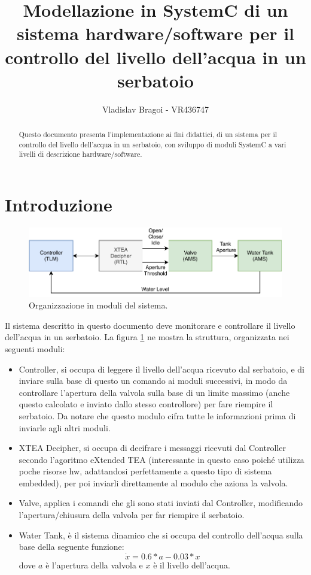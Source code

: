 \documentclass[]{IEEEtran}
\title{Modellazione in SystemC di un sistema hardware/software per il controllo del livello dell'acqua in un serbatoio}
\author{Vladislav Bragoi - VR436747}
\begin{document}
\maketitle

\begin{abstract}
Questo documento presenta l'implementazione ai fini didattici, di un sistema per il controllo del livello dell'acqua in 
un serbatoio, con sviluppo di moduli SystemC a vari livelli di descrizione hardware/software.
\end{abstract}

\section{Introduzione} \label{sec:intro}
\begin{figure}[bt]
	\centering
	\includegraphics[width=\columnwidth]{figures/system.pdf}
	\caption{Organizzazione in moduli del sistema.}
	\label{fig:system}
\end{figure}

Il sistema descritto in questo documento deve monitorare e controllare il livello dell'acqua in un serbatoio. La figura 
\ref{fig:system} 
ne mostra la struttura, organizzata nei seguenti moduli:
\begin{itemize}
    \item Controller, si occupa di leggere il livello dell'acqua ricevuto dal serbatoio, e di inviare sulla base di 
    questo un comando ai moduli successivi, in modo da controllare l'apertura della valvola sulla base di un limite 
    massimo (anche questo calcolato e inviato dallo stesso controllore) per fare riempire il serbatoio. Da notare che 
    questo modulo cifra tutte le informazioni prima di inviarle agli altri moduli.
    
    \item XTEA Decipher, si occupa di decifrare i messaggi ricevuti dal Controller secondo l'agoritmo eXtended TEA 
    (interessante in questo caso poich\'e utilizza poche risorse hw, adattandosi perfettamente a questo tipo di sistema 
    embedded), per poi inviarli direttamente al modulo che aziona la valvola.
    
    \item Valve, applica i comandi che gli sono stati inviati dal Controller, modificando l'apertura/chiusura della 
    valvola per far riempire il serbatoio.
    
    \item Water Tank, \`e il sistema dinamico che si occupa del controllo dell'acqua sulla base della seguente funzione:
     \[\dot{x} = 0.6 * a - 0.03 * x\]
     dove $a$ \`e l'apertura della valvola e $x$ \`e il livello dell'acqua.
\end{itemize}
\end{document}
